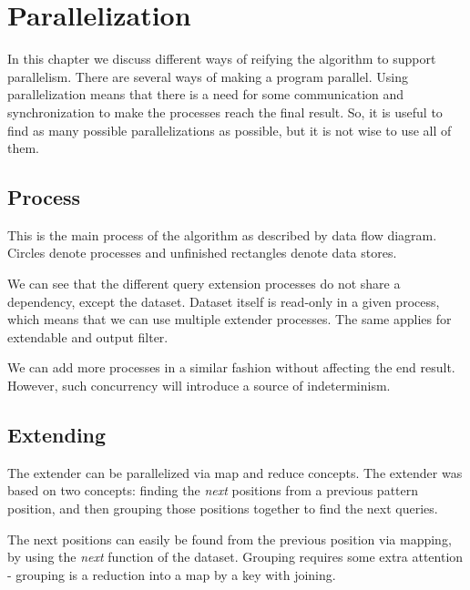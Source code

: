 \chapter{Parallelization}
\label{c:parallelization}

In this chapter we discuss different ways of reifying the algorithm to support parallelism. There are several ways of making a program parallel. Using parallelization means that there is a need for some communication and synchronization to make the processes reach the final result. So, it is useful to find as many possible parallelizations as possible, but it is not wise to use all of them.

\section{Process}

This is the main process of the algorithm as described by data flow diagram.\cite{Kahn74,Lee95} Circles denote processes and unfinished rectangles denote data stores.

\begin{figure}[H]
	\scalebox{0.8}{}
\end{figure}

We can see that the different query extension processes do not share a dependency, except the dataset. Dataset itself is read-only in a given process, which means that we can use multiple extender processes. The same applies for extendable and output filter.

\begin{figure}[H]
  \scalebox{0.8}{}
\end{figure}

We can add more processes in a similar fashion without affecting the end result. However, such concurrency will introduce a source of indeterminism.

\section{Extending}

The extender can be parallelized via map and reduce concepts\cite{MapReduce,SteeleFold}. The extender was based on two concepts: finding the \emph{next} positions from a previous pattern position, and then grouping those positions together to find the next queries.

The next positions can easily be found from the previous position via mapping, by using the \emph{next} function of the dataset. Grouping requires some extra attention - grouping is a reduction into a map by a key with joining.

